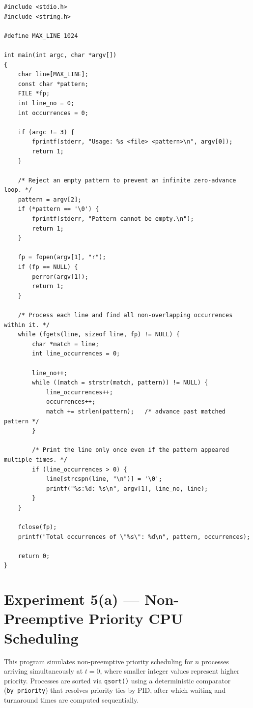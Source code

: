 \documentclass[11pt,a4paper]{article}
\newcommand{\exptheader}[3]{%
    \section[#1: #2]{#1 --- #2}%
    \label{#3}%
}
\begin{document}
\begin{lstlisting}[title={\texttt{expt\_3\_3.c}}]
#include <stdio.h>
#include <string.h>

#define MAX_LINE 1024

int main(int argc, char *argv[])
{
    char line[MAX_LINE];
    const char *pattern;
    FILE *fp;
    int line_no = 0;
    int occurrences = 0;

    if (argc != 3) {
        fprintf(stderr, "Usage: %s <file> <pattern>\n", argv[0]);
        return 1;
    }

    /* Reject an empty pattern to prevent an infinite zero-advance loop. */
    pattern = argv[2];
    if (*pattern == '\0') {
        fprintf(stderr, "Pattern cannot be empty.\n");
        return 1;
    }

    fp = fopen(argv[1], "r");
    if (fp == NULL) {
        perror(argv[1]);
        return 1;
    }

    /* Process each line and find all non-overlapping occurrences within it. */
    while (fgets(line, sizeof line, fp) != NULL) {
        char *match = line;
        int line_occurrences = 0;

        line_no++;
        while ((match = strstr(match, pattern)) != NULL) {
            line_occurrences++;
            occurrences++;
            match += strlen(pattern);   /* advance past matched pattern */
        }

        /* Print the line only once even if the pattern appeared multiple times. */
        if (line_occurrences > 0) {
            line[strcspn(line, "\n")] = '\0';
            printf("%s:%d: %s\n", argv[1], line_no, line);
        }
    }

    fclose(fp);
    printf("Total occurrences of \"%s\": %d\n", pattern, occurrences);

    return 0;
}
\end{lstlisting}

\exptheader{Experiment 5(a)}{Non-Preemptive Priority CPU Scheduling}{exp:5.a}

This program simulates non-preemptive priority scheduling for $n$ processes arriving simultaneously at $t = 0$, where smaller integer values represent higher priority. Processes are sorted via \texttt{qsort()} using a deterministic comparator (\texttt{by\_priority}) that resolves priority ties by PID, after which waiting and turnaround times are computed sequentially.
\end{document}
